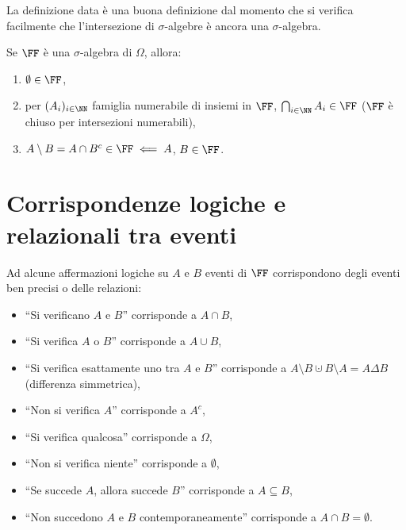 \begin{multicols*}{2}
    \begin{remark}
        La definizione data è una buona definizione dal momento che si
        verifica facilmente che l'intersezione di $\sigma$-algebre è ancora
        una $\sigma$-algebra.
    \end{remark}

    \begin{proposition}[Proprietà di $\FF$] Se $\FF$ è una $\sigma$-algebra
    di $\Omega$, allora:
        \begin{enumerate}[(i.)]
            \item $\emptyset \in \FF$,
            \item per $(A_i)_{i \in \NN}$ famiglia numerabile di insiemi
                in $\FF$, $\bigcap_{i \in \NN} A_i \in \FF$ ($\FF$ è chiuso per intersezioni numerabili),
            \item $A \setminus B = A \cap B^c \in \FF \impliedby A$, $B \in \FF$.
        \end{enumerate}
    \end{proposition}

    \section{Corrispondenze logiche e relazionali tra eventi}

    \begin{remark}
        Ad alcune affermazioni logiche su $A$ e $B$ eventi di $\FF$ corrispondono degli eventi ben precisi o delle
        relazioni:
        \begin{itemize}
            \item ``Si verificano $A$ e $B$'' corrisponde a $A \cap B$,
            \item ``Si verifica $A$ o $B$'' corrisponde a $A \cup B$,
            \item ``Si verifica esattamente uno tra $A$ e $B$'' corrisponde a $A \setminus B \cupdot B \setminus A = A \Delta B$ (differenza simmetrica),
            \item ``Non si verifica $A$'' corrisponde a $A^c$,
            \item ``Si verifica qualcosa'' corrisponde a $\Omega$,
            \item ``Non si verifica niente'' corrisponde a $\emptyset$,
            \item ``Se succede $A$, allora succede $B$'' corrisponde a $A \subseteq B$,
            \item ``Non succedono $A$ e $B$ contemporaneamente'' corrisponde a
                $A \cap B = \emptyset$.
        \end{itemize}
    \end{remark}


\end{multicols*}
